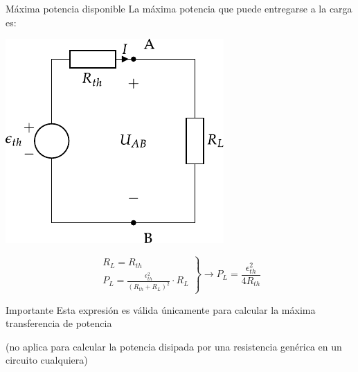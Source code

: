 \documentclass[aspectratio=169, xcolor={usenames,svgnames,dvipsnames}]{beamer}
\begin{document}
\begin{frame}{Máxima potencia disponible}
La \alert{máxima potencia} que puede entregarse a la carga es:

    \vspace{5mm}
    \begin{minipage}[c]{0.4\linewidth}
        \begin{center}
            \includegraphics[height=0.5\textheight]{../figs/thevenin_continua.pdf}
        \end{center}
    \end{minipage}
    \hfill
    \begin{minipage}[c]{0.58\linewidth}
        \begin{equation*}
          \left.
            \begin{matrix}
              R_L = R_{th}\\
              P_L = \frac{\epsilon^2_{th}}{(R_{th} + R_L)^2} \cdot R_L
            \end{matrix} \right\}\rightarrow
          \boxed{P_L = \frac{\epsilon^2_{th}}{4 R_{th}}}
        \end{equation*}
    
        \begin{block}{Importante}
            Esta expresión es \alert{válida únicamente} para calcular la \alert{máxima transferencia} de potencia
        \end{block}
        \centering \small{(no aplica para calcular la potencia disipada por una resistencia genérica en un circuito cualquiera)}
    \end{minipage}
\end{frame}
\end{document}
